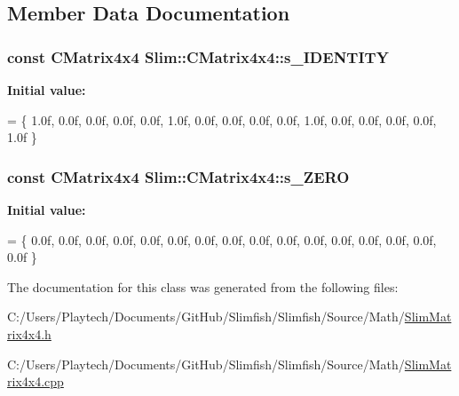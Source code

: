 \subsection{Member Data Documentation}
\hypertarget{class_slim_1_1_c_matrix4x4_adf215fa14b06548d37871d1a8e604e99}{}
\subsubsection[{s\+\_\+\+I\+D\+E\+N\+T\+I\+T\+Y}]{\setlength{\rightskip}{0pt plus 5cm}const {\bf C\+Matrix4x4} Slim\+::\+C\+Matrix4x4\+::s\+\_\+\+I\+D\+E\+N\+T\+I\+T\+Y\hspace{0.3cm}{\ttfamily [static]}}\label{class_slim_1_1_c_matrix4x4_adf215fa14b06548d37871d1a8e604e99}
{\bfseries Initial value\+:}
\begin{DoxyCode}
= \{ 1.0f, 0.0f, 0.0f, 0.0f,
                                            0.0f, 1.0f, 0.0f, 0.0f,
                                            0.0f, 0.0f, 1.0f, 0.0f,
                                            0.0f, 0.0f, 0.0f, 1.0f \}
\end{DoxyCode}
\hypertarget{class_slim_1_1_c_matrix4x4_a234226d5a92f3d8d26c73b6cb55d0721}{}
\subsubsection[{s\+\_\+\+Z\+E\+R\+O}]{\setlength{\rightskip}{0pt plus 5cm}const {\bf C\+Matrix4x4} Slim\+::\+C\+Matrix4x4\+::s\+\_\+\+Z\+E\+R\+O\hspace{0.3cm}{\ttfamily [static]}}\label{class_slim_1_1_c_matrix4x4_a234226d5a92f3d8d26c73b6cb55d0721}
{\bfseries Initial value\+:}
\begin{DoxyCode}
= \{ 0.0f, 0.0f, 0.0f, 0.0f,
                                        0.0f, 0.0f, 0.0f, 0.0f,
                                        0.0f, 0.0f, 0.0f, 0.0f,
                                        0.0f, 0.0f, 0.0f, 0.0f \}
\end{DoxyCode}


The documentation for this class was generated from the following files\+:\begin{DoxyCompactItemize}
\item 
C\+:/\+Users/\+Playtech/\+Documents/\+Git\+Hub/\+Slimfish/\+Slimfish/\+Source/\+Math/\hyperlink{_slim_matrix4x4_8h}{Slim\+Matrix4x4.\+h}\item 
C\+:/\+Users/\+Playtech/\+Documents/\+Git\+Hub/\+Slimfish/\+Slimfish/\+Source/\+Math/\hyperlink{_slim_matrix4x4_8cpp}{Slim\+Matrix4x4.\+cpp}\end{DoxyCompactItemize}
